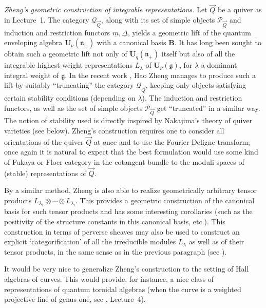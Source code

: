 \documentclass[a4paper,10pt]{amsart}
\def\U{\mathbf{U}}
\def\n{\mathfrak{n}}
\numberwithin{equation}{section}
\begin{document}
\vspace{.2in}

\noindent
\textit{Zheng's geometric construction of integrable representations.} Let $\vec{Q}$ be a quiver as in Lecture~1. The category $\mathcal{Q}_{\vec{Q}}$, along with its set of simple objects $\mathcal{P}_{\vec{Q}}$ and induction and restriction functors $\underline{m}, \underline{\Delta}$, yields a geometric lift of the quantum enveloping algebra $\U_\nu(\n_+)$ with a canonical basis $\mathbf{B}$. It has long been sought to obtain such a geometric lift not only of $\U_q(\n_+)$ itself but also of all the integrable highest weight representations $L_{\lambda}$ of $\U_\nu(\mathfrak{g})$, for $\lambda$ a dominant integral weight of $\mathfrak{g}$. In the recent work \cite{Zheng}, Hao Zheng manages to produce such a lift
by suitably ``truncating'' the category $\mathcal{Q}_{\vec{Q}}$, keeping only objects satisfying certain stability conditions (depending on $\lambda$). The induction and restriction functors, as well as the set of simple objects $\mathcal{P}_{\vec{Q}}$ get ``truncated'' in a similar way. The notion of stability used is directly inspired by Nakajima's theory of quiver varieties (see below). Zheng's construction requires one to consider all orientations of the quiver $\vec{Q}$ at once and to use the Fourier-Deligne transform; once again it is natural to expect that the best formulation would use some kind of Fukaya or Floer category in the cotangent bundle to the moduli spaces of (stable) representations of $\vec{Q}$. 

By a similar method, Zheng is also able to realize geometrically arbitrary tensor products $L_{\lambda_1} \otimes \cdots \otimes L_{\lambda_l}$. This provides a geometric construction of the canonical basis for such tensor products and has some interesting corollaries (such as the positivity of the structure constants in this canonical basis, etc.). 
This construction in terms of perverse sheaves may also be used to construct an explicit `categorification' of all the irreducible modules $L_{\lambda}$ as well as of their tensor products, in the same sense as in the previous paragraph (see \cite{Rouquier}).

\vspace{.1in}

It would be very nice to generalize Zheng's construction to the setting of Hall algebras of curves. This would provide, for instance, a nice class of representations of quantum toroidal algebras (when the curve is a weighted projective line of genus one, see \cite{Trieste}, Lecture~4).
\end{document}
